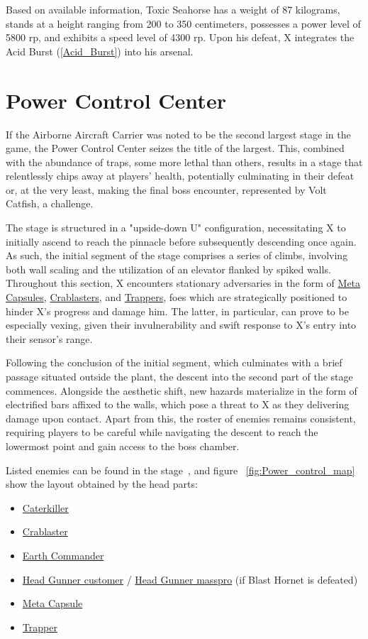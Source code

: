 Based on available information, Toxic Seahorse has a weight of 87 kilograms, stands at a height ranging from 200 to 350 centimeters, possesses a power level of 5800 rp, and exhibits a speed level of 4300 rp. Upon his defeat, X integrates the Acid Burst (\ref{Acid_Burst}) into his arsenal.




\section{Power Control Center}
If the Airborne Aircraft Carrier was noted to be the second largest stage in the game, the Power Control Center seizes the title of the largest. This, combined with the abundance of traps, some more lethal than others, results in a stage that relentlessly chips away at players' health, potentially culminating in their defeat or, at the very least, making the final boss encounter, represented by Volt Catfish, a challenge.

The stage is structured in a "upside-down U" configuration, necessitating X to initially ascend to reach the pinnacle before subsequently descending once again. As such, the initial segment of the stage comprises a series of climbs, involving both wall scaling and the utilization of an elevator flanked by spiked walls. Throughout this section, X encounters stationary adversaries in the form of \hyperlink{enem:Meta_Capsule}{Meta Capsules}, \hyperlink{enem:Crablaster}{Crablasters}, and \hyperlink{enem:Trapper}{Trappers}, foes which are strategically positioned to hinder X's progress and damage him. The latter, in particular, can prove to be especially vexing, given their invulnerability and swift response to X's entry into their sensor's range.

Following the conclusion of the initial segment, which culminates with a brief passage situated outside the plant, the descent into the second part of the stage commences. Alongside the aesthetic  shift, new hazards materialize in the form of electrified bars affixed to the walls, which pose a threat to X as they delivering damage upon contact. Apart from this, the roster of enemies remains consistent, requiring players to be careful while navigating the descent to reach the lowermost point and gain access to the boss chamber.

Listed enemies can be found in the stage~\cite{wiki:Power_control}, and figure ~\ref{fig:Power_control_map} show the layout obtained by the head parts:
\begin{itemize}
	\item \hyperlink{enem:Caterkiller}{Caterkiller}
	\item \hyperlink{enem:Crablaster}{Crablaster}
	\item \hyperlink{enem:Earth_Commander}{Earth Commander}
	\item \hyperlink{enem:Head_Gunner_customer}{Head Gunner customer} / \hyperlink{enem:Head_Gunner_masspro}{Head Gunner masspro} (if Blast Hornet is defeated) 
	\item \hyperlink{enem:Meta_Capsule}{Meta Capsule}
	\item \hyperlink{enem:Trapper}{Trapper}
\end{itemize}

